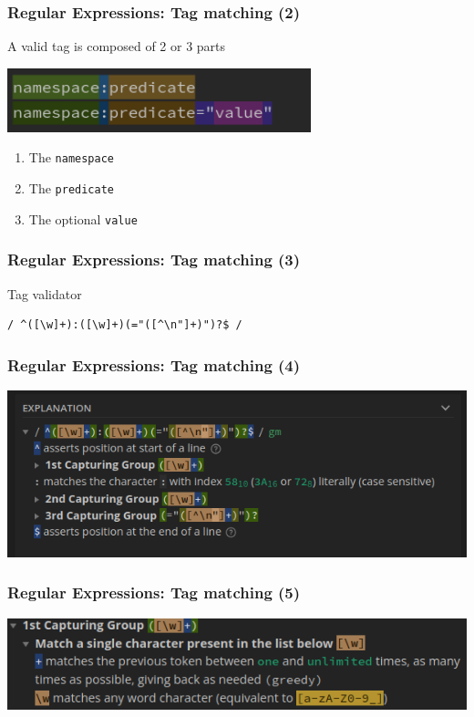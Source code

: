\documentclass{beamer}
\begin{document}
\begin{frame}[fragile]
    \frametitle{Regular Expressions: Tag matching (2)}
    A valid tag is composed of 2 or 3 parts
    \begin{center}
        \includegraphics[width=0.66\textwidth]{pics/regex/regex_intro.png}
    \end{center}
    \begin{enumerate}
        \item The \texttt{namespace}
        \item The \texttt{predicate}
        \item The optional \texttt{value}
    \end{enumerate}
\end{frame}

\begin{frame}[fragile]
    \frametitle{Regular Expressions: Tag matching (3)}
    \begin{center}
        Tag validator
    \end{center}
    {
        \Large
        \begin{verbatim}/ ^([\w]+):([\w]+)(="([^\n"]+)")?$ /\end{verbatim}
    }
\end{frame}

\begin{frame}[fragile]
    \frametitle{Regular Expressions: Tag matching (4)}
    \begin{center}
        \includegraphics[width=1.0\textwidth]{pics/regex/regex_tag1.png}
    \end{center}
\end{frame}

\begin{frame}[fragile]
    \frametitle{Regular Expressions: Tag matching (5)}
    \begin{center}
        \includegraphics[width=1.0\textwidth]{pics/regex/regex_tag2.png}
    \end{center}
\end{frame}
\end{document}
